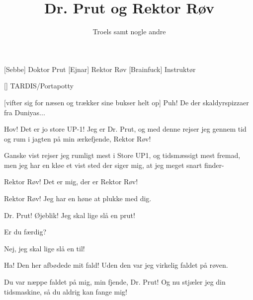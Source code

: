 \documentclass[a4paper,11pt]{article}
\title{Dr. Prut og Rektor Røv}
\author{Troels samt nogle andre}
\begin{document}
\maketitle

\begin{roles}
[Sebbe] Doktor Prut
[Ejnar] Rektor Røv
[Brainfuck] Instruktør
\end{roles}

\begin{props}
[] TARDIS/Portapotty
\end{props}

\begin{sketch}



[vifter sig for næsen og trækker sine bukser helt op] Puh!  De der
skaldyrspizzaer fra Duniyas...


 Hov!   Det er jo store UP-1!  Jeg
er Dr. Prut, og med denne  rejser jeg gennem tid og
rum i jagten på min ærkefjende, Rektor Røv!

 Ganske vist rejser jeg rumligt mest i Store UP1, og
tidsmæssigt mest fremad, men jeg har en kløe et vist sted der siger mig,
at jeg meget snart finder-


 Rektor Røv!  Det er mig, der er Rektor Røv!

 Rektor Røv!  Jeg har en høne at plukke med dig.

 Dr. Prut!  Øjeblik!  Jeg skal lige slå en prut!


 Er du færdig?

 Nej, jeg skal lige slå en til!



 Ha!  Den her afbødede mit fald!    Uden den var jeg virkelig faldet på røven.

 Du var næppe faldet på mig, min fjende, Dr. Prut!  Og nu
stjæler jeg din tidsmaskine, så du aldrig kan fange mig!


\end{sketch}
\end{document}
